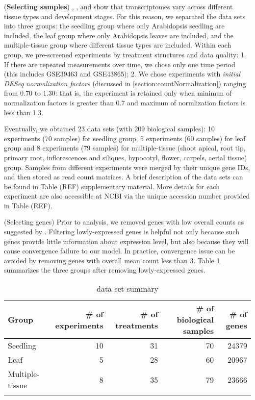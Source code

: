 \documentclass[11pt, a4paper]{article}
\begin{document}
  
   
   
  (\textbf{Selecting samples}) \cite{czechowski2005genome}, \cite{hruz2011refgenes}, and
   \cite{dekkers2012identification} show that transcriptomes vary across different tissue types and development stages. For this reason, we separated the data sets into three groups: the seedling group where only Arabidopsis seedling are included, the leaf group where only Arabidopsis leaves are included, and the multiple-tissue group where different tissue types are included. Within each group, we pre-screened experiments by treatment structures and data quality: 1. If there are repeated measurements over time, we chose only one time period (this includes GSE39463 and GSE43865); 2. We chose experiments with \textit{initial DESeq normalization factors} (discussed in \ref{section:countNormalization}) ranging from 0.70 to 1.30: that is, the experiment is retained only when minimun of normalization factors is greater than 0.7 and maximun of normlization factors is less than 1.3. 
   
    Eventually, we obtained 23 data sets (with 209 biological samples): 10 experiments (70 samples) for seedling group, 5 experiments (60 samples) for leaf group and 8 experiments (79 samples) for multiple-tissue (shoot apical,  root tip, primary root, inflorescences and siliques, hypocotyl, flower, carpels, aerial tissue) group. Samples from different experiments were merged by their unique gene IDs, and then stored as read count matrices. A brief description of the data sets can be found in Table (REF) supplementary material. More details for each experiment are also accessible at NCBI via the unique accession number provided in Table (REF).
   
   
	 (Selecting genes) Prior to analysis, we removed genes with low overall counts as suggested by \cite{anders2013count}. Filtering lowly-expressed genes is helpful not only because such genes provide little information about expression level,  but also because they will cause convergence failure to our model. In practice, convergence issue can be avoided by removing genes with overall mean count less than 3. Table \ref{table:TableSet3} summarizes the three groups after removing lowly-expressed genes.
   
   \begin{table}[h]
   	\centering
   	\caption[3.2]{data set summary}
   	\begin{tabular}{lrrrr} \hline
   		Group & \# of experiments & \# of treatments  & \# of biological samples & \# of genes \\ \hline
   		Seedling &10 & 31 &70  &24379  \\
   		Leaf &5 & 28 & 60 &20967  \\
   		Multiple-tissue &8 &35  &79  & 23666\\ \hline
   		 \label{table:TableSet3}
   	\end{tabular}
   \end{table}
   
\end{document}
